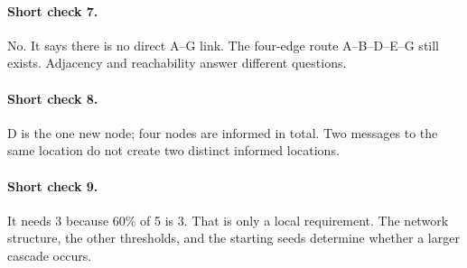 \documentclass[11pt,letterpaper]{article}
\begin{document}
{\paragraph{Short check 7.}
No. It says there is no direct A--G link. The four-edge route A--B--D--E--G still exists. Adjacency and reachability answer different questions.


\paragraph{Short check 8.}
D is the one new node; four nodes are informed in total. Two messages to the same location do not create two distinct informed locations.


\paragraph{Short check 9.}
It needs 3 because 60\% of 5 is 3. That is only a local requirement. The network structure, the other thresholds, and the starting seeds determine whether a larger cascade occurs.



}
\end{document}
